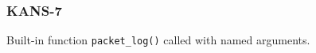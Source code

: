 \subsubsection{KANS-7}\label{sec:error_code_kans_7}

Built-in function \texttt{packet\_log()} called with named arguments.


